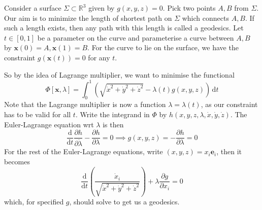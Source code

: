 \documentclass{article}
\begin{document}
\begin{example}
    Consider a surface $\Sigma\subset\mathbb R^3$ given by $g(x,y,z)=0$.
    Pick two points $A,B$ from $\Sigma$.
    Our aim is to minimize the length of shortest path on $\Sigma$ which connects $A,B$.
    If such a length exists, then any path with this length is called a geodesics.
    Let $t\in[0,1]$ be a parameter on the curve and parameterise a curve between $A,B$ by $\mathbf{x}(0)=A,\mathbf{x}(1)=B$.
    For the curve to lie on the surface, we have the constraint $g(\mathbf{x}(t))=0$ for any $t$.

    So by the idea of Lagrange multiplier, we want to minimise the functional
    $$\Phi[\mathbf{x},\lambda]=\int_0^1\left( \sqrt{\dot{x}^2+\dot{y}^2+\dot{z}^2} -\lambda(t) g(x,y,z)\right)\,\mathrm dt$$
    Note that the Lagrange multiplier is now a function $\lambda=\lambda(t)$, as our constraint has to be valid for all $t$.
    Write the integrand in $\Phi$ by $h(x,y,z,\lambda,\dot{x},\dot{y},\dot{z})$.
    The Euler-Lagrange equation wrt $\lambda$ is then
    $$\frac{\mathrm d}{\mathrm dt}\frac{\partial h}{\partial \dot{\lambda}}-\frac{\partial h}{\partial\lambda}=0\implies g(x,y,z)=-\frac{\partial h}{\partial\lambda}=0$$
    For the rest of the Euler-Lagrange equations, write $(x,y,z)=x_i\mathbf{e}_i$, then it becomes
    $$\frac{\mathrm d}{\mathrm dt}\left( \frac{\dot{x}_i}{\sqrt{\dot{x}^2+\dot{y}^2+\dot{z}^2}} \right)+\lambda\frac{\partial g}{\partial x_i}=0$$
    which, for specified $g$, should solve to get us a geodesics.
\end{example}
\end{document}
